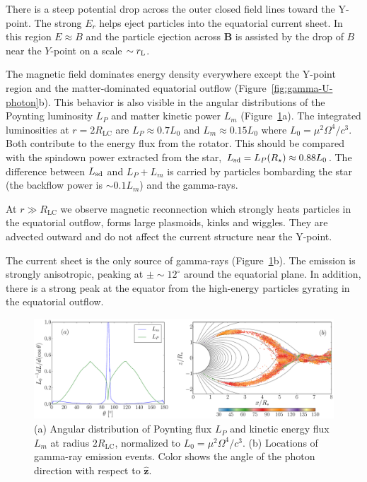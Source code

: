 There is a steep potential drop across the outer closed field lines toward the
Y-point. The strong $E_r$ helps eject particles into the equatorial current sheet.
In this region $E\approx B$ and the particle ejection across $\mathbf{B}$ is assisted by
the drop of $B$ near the $Y$-point on a scale $\sim r_{\rm L}$.

The magnetic field dominates energy density everywhere except the Y-point region
and the matter-dominated equatorial outflow (Figure~\ref{fig:gamma-U-photon}b).
This behavior is also visible in the angular distributions of the Poynting luminosity
$L_P$ and matter kinetic power $L_m$ (Figure~\ref{fig:fluxes}a).
The integrated luminosities at $r=2R_\mathrm{LC}$ are $L_P\approx 0.7 L_0$ and
$L_m\approx 0.15 L_0$ where $L_0=\mu^2\Omega^4/c^3$.
Both contribute to the energy flux from the rotator.
This should be compared with the spindown power extracted from the star,
$L_{\rm sd}=L_P(R_{\star})\approx 0.88L_0$.
The difference between $L_{\rm sd}$ and
$L_P+L_m$ is carried by particles bombarding the star
(the backflow power is $\sim 0.1L_m$) and the gamma-rays.

At $r\gg R_\mathrm{LC}$ we observe magnetic reconnection which strongly heats
particles in the equatorial outflow, forms large plasmoids, kinks and wiggles.
They are advected outward and do not affect the current structure near the Y-point.

The current sheet is the only source of gamma-rays (Figure~\ref{fig:fluxes}b).
The emission is strongly anisotropic, peaking at
$\pm \sim 12^{\circ}$ around the equatorial plane. In addition,
there is a strong peak at the equator from the high-energy
particles gyrating in the equatorial outflow.

\begin{figure}[t]
    \hspace*{-0.6cm}
    \includegraphics[width=1.07\textwidth]{pics/chap3/figure4.eps}
    \caption[Poynting flux and gamma ray emission events in the type I aligned
    rotator simulation]{\small (a) Angular distribution of Poynting flux $L_P$
      and kinetic energy flux $L_m$ at radius $2R_\mathrm{LC}$, normalized to
      $L_0 = \mu^2\Omega^4/c^3$. (b) Locations of gamma-ray emission events.
      Color shows the angle of the photon direction with respect to
      $\hat{\mathbf{z}}$. }
    \label{fig:fluxes}
\end{figure}


